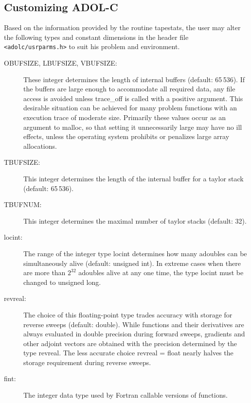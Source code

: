 \documentclass[11pt,twoside]{article}
\begin{document}
\subsection{Customizing ADOL-C}
\label{Customizing}
%
Based on the information provided by the routine {\sf tapestats}, the user may alter the
following types and constant dimensions in the header file \verb=<adolc/usrparms.h>=
to suit his problem and environment.

\begin{description}
\item[{\sf OBUFSIZE}, {\sf LBUFSIZE}, {\sf VBUFSIZE}{\rm :}] These integer determines the length of
in\-ter\-nal buf\-fers (default: 65$\,$536). If the buffers are large enough to accommodate all
required data, any file access is avoided unless {\sf trace\_off}
is called with a positive argument. This desirable situation can
be achieved for many problem functions with an execution trace of moderate
size. Primarily these values occur as an argument 
to {\sf malloc}, so that setting it unnecessarily large may have no
ill effects, unless the operating system prohibits or penalizes large
array allocations.

\item[{\sf TBUFSIZE}{\rm :}] This integer determines the length of the 
in\-ter\-nal buf\-fer for a taylor stack (default: 65$\,$536). 

\item[{\sf TBUFNUM}{\rm :}] This integer determines the maximal number of taylor stacks (default: 32).

\item[{\sf locint}{\rm :}] The range of the integer type 
{\sf locint} determines how many {\sf adouble}s can be simultaneously
alive (default: {\sf unsigned int}).  In extreme cases when there are more than $2^{32}$ {\sf adouble}s
alive at any one time, the type {\sf locint} must be changed to 
 {\sf unsigned long}.

\item[{\sf revreal}{\rm :}] The choice of this floating-point type
trades accuracy with storage for reverse sweeps (default: {\sf double}). While functions
and their derivatives are always evaluated in double precision 
during forward sweeps, gradients and other adjoint vectors are obtained
with the precision determined by the type {\sf revreal}. The less
accurate choice {\sf revreal} = {\sf float} nearly halves the
storage requirement during reverse sweeps.

\item[{\sf fint}{\rm :}] The integer data type used by Fortran callable versions of functions.


\end{description}
\end{document}
